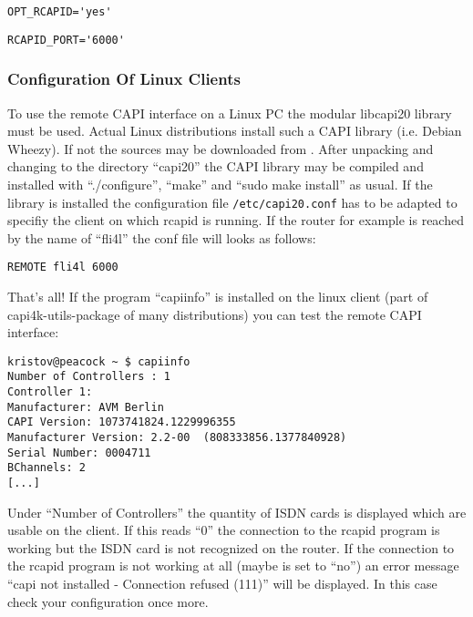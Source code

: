 \begin{description}
\verb*?OPT_RCAPID='yes'?

\verb*?RCAPID_PORT='6000'?
\end{description}

\subsubsection{Configuration Of Linux Clients}
To use the remote CAPI interface on a Linux PC the modular libcapi20 library 
must be used. Actual Linux distributions install such a CAPI library (i.e.
Debian Wheezy). If not the sources may be downloaded from
.
After unpacking and changing to the directory ``capi20'' the CAPI library may be 
compiled and installed with ``./configure'', ``make'' and ``sudo make install'' 
as usual. If the library is installed the configuration file \texttt{/etc/capi20.conf} 
has to be adapted to specifiy the client on which rcapid is running. If the router for 
example is reached by the name of ``fli4l'' the conf file will looks as follows:

\begin{example}
\begin{verbatim}
REMOTE fli4l 6000
\end{verbatim}
\end{example}

That's all! If the program ``capiinfo'' is installed on the linux client (part of 
capi4k-utils-package of many distributions) you can test the remote CAPI interface:

\begin{example}
\begin{verbatim}
kristov@peacock ~ $ capiinfo 
Number of Controllers : 1
Controller 1:
Manufacturer: AVM Berlin
CAPI Version: 1073741824.1229996355
Manufacturer Version: 2.2-00  (808333856.1377840928)
Serial Number: 0004711
BChannels: 2
[...]
\end{verbatim}
\end{example}

Under ``Number of Controllers'' the quantity of ISDN cards is displayed which are 
usable on the client. If this reads ``0'' the connection to the rcapid program is 
working but the ISDN card is not recognized on the router. If the connection to the 
rcapid program is not working at all (maybe  is set to ``no'') 
an error message ``capi not installed - Connection refused (111)'' will be displayed. 
In this case check your configuration once more.
